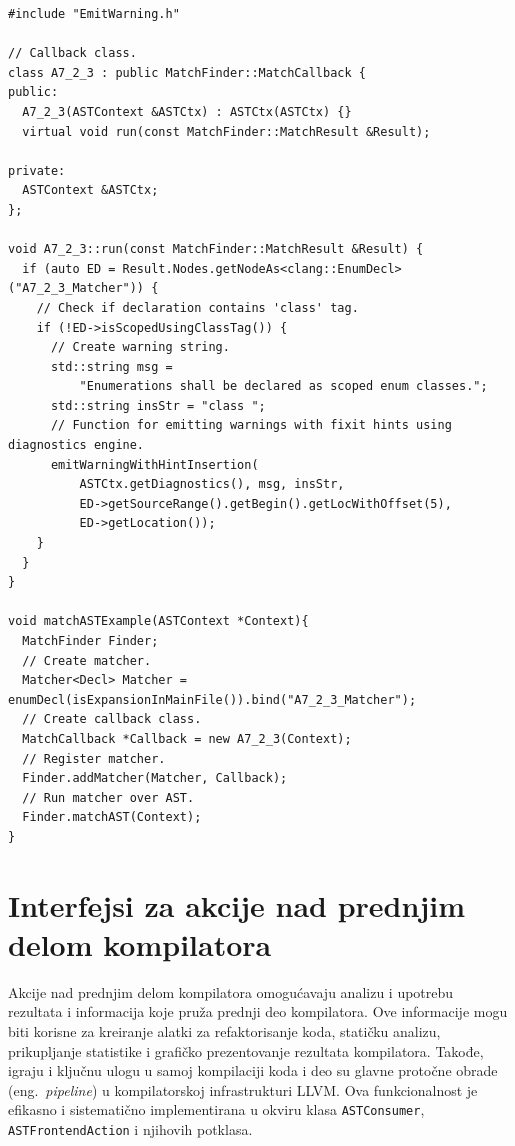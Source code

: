 \documentclass[12pt,oneside]{memoir}
\begin{document}
\begin{lstlisting}[style=customc,  caption={Primer upariva\v{c}a koji pronalazi sve deklaracije nabrojivog tipa koje ne koriste sintaksu \texttt{enum class}. Ovaj primer demonstrira i upotrebu klasa \texttt{MatchFinder}, \texttt{MatchCallback} i \texttt{MatchResult}. Funkcija \texttt{emitWarningWithHintInsertion} implementirana je na listingu \ref{lst:dijagnostika} i dostupna je kroz zaglavlje \texttt{EmitWarning.h}}, label=lst:MatcherList]
#include "EmitWarning.h"

// Callback class.
class A7_2_3 : public MatchFinder::MatchCallback {
public:
  A7_2_3(ASTContext &ASTCtx) : ASTCtx(ASTCtx) {}
  virtual void run(const MatchFinder::MatchResult &Result);

private:
  ASTContext &ASTCtx;
};

void A7_2_3::run(const MatchFinder::MatchResult &Result) {
  if (auto ED = Result.Nodes.getNodeAs<clang::EnumDecl>("A7_2_3_Matcher")) {
    // Check if declaration contains 'class' tag.
    if (!ED->isScopedUsingClassTag()) {
      // Create warning string.
      std::string msg =
          "Enumerations shall be declared as scoped enum classes.";
      std::string insStr = "class ";
      // Function for emitting warnings with fixit hints using diagnostics engine.
      emitWarningWithHintInsertion(
          ASTCtx.getDiagnostics(), msg, insStr,
          ED->getSourceRange().getBegin().getLocWithOffset(5),
          ED->getLocation());
    }
  }
}

void matchASTExample(ASTContext *Context){
  MatchFinder Finder;
  // Create matcher.
  Matcher<Decl> Matcher = enumDecl(isExpansionInMainFile()).bind("A7_2_3_Matcher");
  // Create callback class.
  MatchCallback *Callback = new A7_2_3(Context);
  // Register matcher.
  Finder.addMatcher(Matcher, Callback);
  // Run matcher over AST.
  Finder.matchAST(Context);
}
\end{lstlisting}


\section{Interfejsi za akcije nad prednjim delom kompilatora}
\label{sec:interfejsi}

Akcije nad prednjim delom kompilatora omogu\'{c}avaju analizu i upotrebu rezultata i informacija koje pru\v{z}a prednji deo kompilatora. Ove informacije mogu biti korisne za kreiranje alatki za refaktorisanje koda, stati\v{c}ku analizu, prikupljanje statistike i grafi\v{c}ko prezentovanje rezultata kompilatora. Takođe, igraju i klju\v{c}nu ulogu u samoj kompilaciji koda i deo su glavne proto\v{c}ne obrade (eng.~\textit{pipeline}) u kompilatorskoj infrastrukturi LLVM.
Ova funkcionalnost je efikasno i sistemati\v{c}no implementirana u okviru klasa \texttt{ASTConsumer}, \texttt{ASTFrontendAction} i njihovih potklasa.
\end{document}

